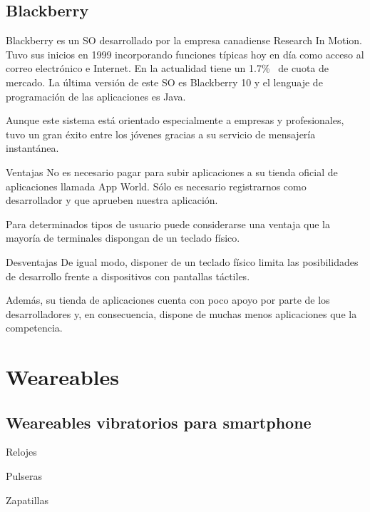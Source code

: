 \subsection{Blackberry}

Blackberry es un \acs{SO} desarrollado por la empresa canadiense Research In Motion. Tuvo sus
inicios en 1999 incorporando funciones típicas hoy en día como acceso al correo electrónico e
Internet. En la actualidad tiene un 1.7\%~\cite{Llamas13} de cuota de mercado. La última versión de
este \acs{SO} es Blackberry 10 y el lenguaje de programación de las aplicaciones es Java.

Aunque este sistema está orientado especialmente a empresas y profesionales, tuvo un gran éxito
entre los jóvenes gracias a su servicio de mensajería instantánea.

\begin{definitionlist}
  \item[Ventajas] No es necesario pagar para subir aplicaciones a su tienda oficial de aplicaciones
    llamada App World. Sólo es necesario registrarnos como desarrollador y que aprueben nuestra
    aplicación.

    Para determinados tipos de usuario puede considerarse una ventaja que la mayoría de terminales
    dispongan de un teclado físico.

  \item[Desventajas] De igual modo, disponer de un teclado físico limita las posibilidades de
    desarrollo frente a dispositivos con pantallas táctiles.

    Además, su tienda de aplicaciones cuenta con poco apoyo por parte de los desarrolladores y, en
    consecuencia, dispone de muchas menos aplicaciones que la competencia.

\end{definitionlist}

\section{Weareables}



\subsection{Weareables vibratorios para smartphone}


\begin{definitionlist}
  \item[Relojes]

  \item[Pulseras]

  \item[Zapatillas]
 
\end{definitionlist}


